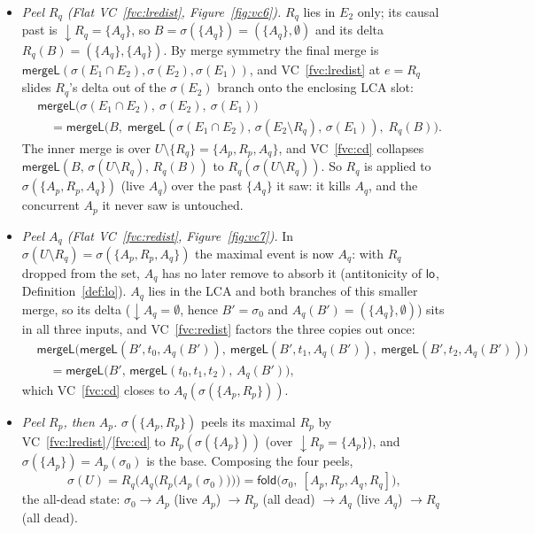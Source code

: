 \documentclass[11pt]{article}
\newcommand{\mergeL}{\mathsf{mergeL}}
\newcommand{\Sinit}{\sigma_0}
\newcommand{\loE}[1]{\mathsf{lo}^{#1}}
\newcommand{\dow}[1]{{\downarrow}#1}
\newcommand{\fold}{\mathsf{fold}}
\begin{document}
\begin{itemize}[leftmargin=1.6em]
\item \emph{Peel $R_q$ (Flat VC~\ref{fvc:lredist}, Figure~\ref{fig:vc6}).}
  $R_q$ lies in $E_2$ only; its causal past is $\dow{R_q} = \{A_q\}$, so
  $B = \sigma(\{A_q\}) = (\{A_q\}, \emptyset)$ and its delta
  $R_q(B) = (\{A_q\}, \{A_q\})$. By merge symmetry the final merge is
  $\mergeL(\sigma(E_1{\cap}E_2), \sigma(E_2), \sigma(E_1))$, and
  VC~\ref{fvc:lredist} at $e = R_q$ slides $R_q$'s delta out of the
  $\sigma(E_2)$ branch onto the enclosing LCA slot:
  \[
  \begin{aligned}
    &\mergeL\bigl(\sigma(E_1{\cap}E_2),\ \sigma(E_2),\ \sigma(E_1)\bigr) \\
    &\quad{}= \mergeL\bigl(B,\; \mergeL(\sigma(E_1{\cap}E_2),\, \sigma(E_2{\setminus}R_q),\, \sigma(E_1)),\; R_q(B)\bigr).
  \end{aligned}
  \]
  The inner merge is over $U \setminus \{R_q\} = \{A_p, R_p, A_q\}$, and
  VC~\ref{fvc:cd} collapses $\mergeL(B,\, \sigma(U{\setminus}R_q),\, R_q(B))$ to
  $R_q(\sigma(U{\setminus}R_q))$. So $R_q$ is applied to
  $\sigma(\{A_p, R_p, A_q\})$ (live $A_q$) over the past $\{A_q\}$ it saw: it
  kills $A_q$, and the concurrent $A_p$ it never saw is untouched.
\item \emph{Peel $A_q$ (Flat VC~\ref{fvc:redist}, Figure~\ref{fig:vc7}).}
  In $\sigma(U{\setminus}R_q) = \sigma(\{A_p, R_p, A_q\})$ the maximal event is
  now $A_q$: with $R_q$ dropped from the set, $A_q$ has no later remove to
  absorb it (antitonicity of $\loE{}$, Definition~\ref{def:lo}). $A_q$ lies in
  the LCA and both branches of this smaller merge, so its delta
  ($\dow{A_q} = \emptyset$, hence $B' = \Sinit$ and
  $A_q(B') = (\{A_q\}, \emptyset)$) sits in all three inputs, and
  VC~\ref{fvc:redist} factors the three copies out once:
  \[
  \begin{aligned}
    &\mergeL\bigl(\mergeL(B',t_0,A_q(B')),\ \mergeL(B',t_1,A_q(B')),\ \mergeL(B',t_2,A_q(B'))\bigr) \\
    &\quad{}= \mergeL\bigl(B',\, \mergeL(t_0,t_1,t_2),\, A_q(B')\bigr),
  \end{aligned}
  \]
  which VC~\ref{fvc:cd} closes to $A_q(\sigma(\{A_p, R_p\}))$.
\item \emph{Peel $R_p$, then $A_p$.} $\sigma(\{A_p, R_p\})$ peels its maximal
  $R_p$ by VC~\ref{fvc:lredist}/\ref{fvc:cd} to $R_p(\sigma(\{A_p\}))$ (over
  $\dow{R_p} = \{A_p\}$), and $\sigma(\{A_p\}) = A_p(\Sinit)$ is the base.
  Composing the four peels,
  \[
    \sigma(U) = R_q\bigl(A_q\bigl(R_p\bigl(A_p(\Sinit)\bigr)\bigr)\bigr)
    = \fold\bigl(\Sinit,\ [A_p, R_p, A_q, R_q]\bigr),
  \]
  the all-dead state: $\Sinit \to A_p$ (live $A_p$) $\to R_p$ (all dead)
  $\to A_q$ (live $A_q$) $\to R_q$ (all dead).
\end{itemize}
\end{document}
